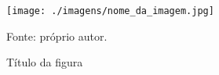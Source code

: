 \begin{figure}[htp]
    \centering
    \label{fig:nome_da_figura}
    \caption{Título da figura}
    \texttt{[image: ./imagens/nome\_da\_imagem.jpg]}
    \par \footnotesize Fonte: próprio autor. %
\end{figure}